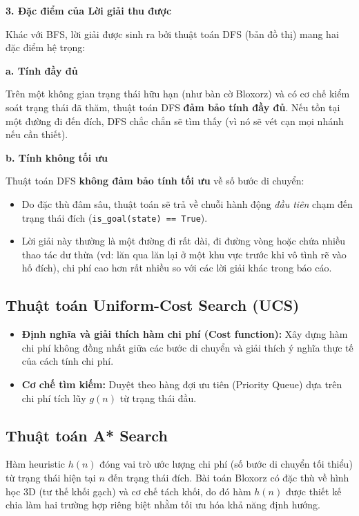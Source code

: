 \documentclass[12pt,a4paper]{article}
\begin{document}
\textbf{3. Đặc điểm của Lời giải thu được}

Khác với BFS, lời giải được sinh ra bởi thuật toán DFS (bản đồ thị) mang hai đặc điểm hệ trọng:

\textbf{a. Tính đầy đủ}

Trên một không gian trạng thái hữu hạn (như bàn cờ Bloxorz) và có cơ chế kiểm soát trạng thái đã thăm, thuật toán DFS \textbf{đảm bảo tính đầy đủ}. Nếu tồn tại một đường đi đến đích, DFS chắc chắn sẽ tìm thấy (vì nó sẽ vét cạn mọi nhánh nếu cần thiết).

\textbf{b. Tính không tối ưu }

Thuật toán DFS \textbf{không đảm bảo tính tối ưu} về số bước di chuyển:
\begin{itemize}
    \item Do đặc thù đâm sâu, thuật toán sẽ trả về chuỗi hành động \textit{đầu tiên} chạm đến trạng thái đích (\texttt{is\_goal(state) == True}).
    \item Lời giải này thường là một đường đi rất dài, đi đường vòng hoặc chứa nhiều thao tác dư thừa (vd: lăn qua lăn lại ở một khu vực trước khi vô tình rẽ vào hố đích), chi phí cao hơn rất nhiều so với các lời giải khác trong báo cáo.
\end{itemize}

\subsection{Thuật toán Uniform-Cost Search (UCS)}
\begin{itemize}
    \item \textbf{Định nghĩa và giải thích hàm chi phí (Cost function):} Xây dựng hàm chi phí không đồng nhất giữa các bước di chuyển và giải thích ý nghĩa thực tế của cách tính chi phí.
    \item \textbf{Cơ chế tìm kiếm:} Duyệt theo hàng đợi ưu tiên (Priority Queue) dựa trên chi phí tích lũy $g(n)$ từ trạng thái đầu.
\end{itemize}

\subsection{Thuật toán A* Search}
Hàm heuristic $h(n)$ đóng vai trò ước lượng chi phí (số bước di chuyển tối thiểu) từ trạng thái hiện tại $n$ đến trạng thái đích. Bài toán Bloxorz có đặc thù về hình học 3D (tư thế khối gạch) và cơ chế tách khối, do đó hàm $h(n)$ được thiết kế chia làm hai trường hợp riêng biệt nhằm tối ưu hóa khả năng định hướng.
\end{document}
